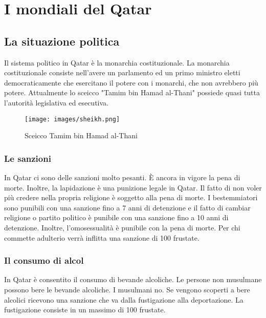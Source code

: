 \documentclass[a4paper, 12pt]{article}
\begin{document}

\section{I mondiali del Qatar}

\subsection{La situazione politica}

Il sistema politico in Qatar è la monarchia costituzionale. La monarchia costituzionale consiste nell'avere un parlamento ed un primo ministro eletti democraticamente che esercitano il potere con i monarchi, che non avrebbero più potere. Attualmente lo sceicco "Tamim bin Hamad al-Thani" possiede quasi tutta l'autorità legislativa ed esecutiva.

\begin{figure}[h]
    \centering
    \texttt{[image: images/sheikh.png]}
    \caption{Sceicco Tamim bin Hamad al-Thani}
\end{figure}



\subsubsection{Le sanzioni}

In Qatar ci sono delle sanzioni molto pesanti. È ancora in vigore la pena di morte. Inoltre, la lapidazione è una punizione legale in Qatar. Il fatto di non voler più credere nella propria religione è soggetto alla pena di morte. I bestemmiatori sono punibili con una sanzione fino a 7 anni di detenzione e il fatto di cambiar religione o partito politico è punibile con una sanzione fino a 10 anni di detenzione. Inoltre, l'omosessualità è punibile con la pena di morte. Per chi commette adulterio verrà inflitta una sanzione di 100 frustate.

\subsubsection{Il consumo di alcol}

In Qatar è consentito il consumo di bevande alcoliche. Le persone non musulmane possono bere le bevande alcoliche. I musulmani no. Se vengono scoperti a bere alcolici ricevono una sanzione che va dalla fustigazione alla deportazione. La fustigazione consiste in un massimo di 100 frustate.
\end{document}
